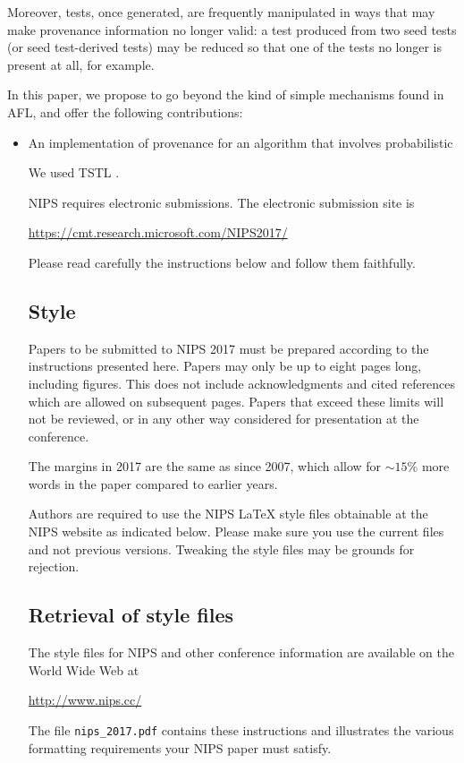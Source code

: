 \documentclass[final]{article}
\begin{document}
Moreover, tests, once generated, are frequently manipulated in ways
that may make provenance information no longer valid:  a test produced
from two seed tests (or seed test-derived tests) may be reduced
\cite{DD} so that one of the tests no longer is present at all, for example.

In this paper, we propose to go beyond the kind of simple mechanisms
found in AFL, and
offer the following contributions:

\begin{itemize}
\item An implementation of provenance for an algorithm that involves
  probabilistic 



We used TSTL \cite{tstlsttt}.

NIPS requires electronic submissions.  The electronic submission site
is
\begin{center}
  \url{https://cmt.research.microsoft.com/NIPS2017/}
\end{center}

Please read carefully the instructions below and follow them
faithfully.

\subsection{Style}

Papers to be submitted to NIPS 2017 must be prepared according to the
instructions presented here. Papers may only be up to eight pages
long, including figures. This does not include acknowledgments and 
cited references which are allowed on subsequent pages.
Papers that exceed these limits will not be reviewed, or in any
other way considered for presentation at the conference.

The margins in 2017 are the same as since 2007, which allow for
$\sim$$15\%$ more words in the paper compared to earlier years.

Authors are required to use the NIPS \LaTeX{} style files obtainable
at the NIPS website as indicated below. Please make sure you use the
current files and not previous versions. Tweaking the style files may
be grounds for rejection.

\subsection{Retrieval of style files}

The style files for NIPS and other conference information are
available on the World Wide Web at
\begin{center}
  \url{http://www.nips.cc/}
\end{center}
The file \verb+nips_2017.pdf+ contains these instructions and
illustrates the various formatting requirements your NIPS paper must
satisfy.


\end{itemize}
\end{document}
